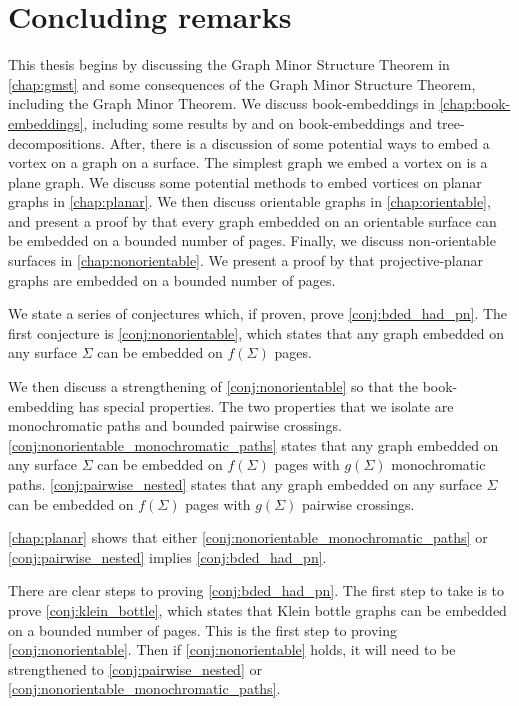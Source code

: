\chapter{Concluding remarks}\label{chap:Future Work}

This thesis begins by discussing the Graph Minor Structure Theorem in \cref{chap:gmst} and some consequences of the Graph Minor Structure Theorem, including the Graph Minor Theorem. We discuss book-embeddings in \cref{chap:book-embeddings}, including some results by \textcite{ganleyPagenumberTrees2001} and \textcite{hickingbothamStackNumberCliqueSum2023} on book-embeddings and tree-decompositions. After, there is a discussion of some potential ways to embed a vortex on a graph on a surface. The simplest graph we embed a vortex on is a plane graph. We discuss some potential methods to embed vortices on planar graphs in \cref{chap:planar}. We then discuss orientable graphs in \cref{chap:orientable}, and present a proof by \textcite{heathPagenumberGenusGraphs1992} that every graph embedded on an orientable surface can be embedded on a bounded number of pages. Finally, we discuss non-orientable surfaces in \cref{chap:nonorientable}. We present a proof by \textcite{nakamotoBookEmbeddingProjectiveplanar2015} that projective-planar graphs are embedded on a bounded number of pages.

We state a series of conjectures which, if proven, prove \cref{conj:bded_had_pn}. The first conjecture is \cref{conj:nonorientable}, which states that any graph embedded on any surface $\Sigma$ can be embedded on $f(\Sigma)$ pages. 

We then discuss a strengthening of \cref{conj:nonorientable} so that the book-embedding has special properties. The two properties that we isolate are monochromatic paths and bounded pairwise crossings. \cref{conj:nonorientable_monochromatic_paths} states that any graph embedded on any surface $\Sigma$ can be embedded on $f(\Sigma)$ pages with $g(\Sigma)$ monochromatic paths. \cref{conj:pairwise_nested} states that any graph embedded on any surface $\Sigma$ can be embedded on $f(\Sigma)$ pages with $g(\Sigma)$ pairwise crossings. 

\cref{chap:planar} shows that either \cref{conj:nonorientable_monochromatic_paths} or \cref{conj:pairwise_nested} implies \cref{conj:bded_had_pn}.

There are clear steps to proving \cref{conj:bded_had_pn}. The first step to take is to prove \cref{conj:klein_bottle}, which states that Klein bottle graphs can be embedded on a bounded number of pages. This is the first step to proving \cref{conj:nonorientable}. Then if \cref{conj:nonorientable} holds, it will need to be strengthened to \cref{conj:pairwise_nested} or \cref{conj:nonorientable_monochromatic_paths}. 
